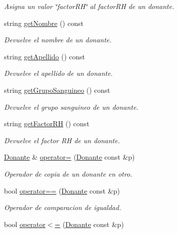 \begin{DoxyCompactItemize}
\begin{DoxyCompactList}\small\item\em Asigna un valor \char`\"{}factor\-R\-H\char`\"{} al factor\-R\-H de un donante. \end{DoxyCompactList}\item 
string \hyperlink{classed_1_1Donante_a6ee5ef3051ee5e87aecefbbb68907d4a}{get\-Nombre} () const 
\begin{DoxyCompactList}\small\item\em Devuelve el nombre de un donante. \end{DoxyCompactList}\item 
string \hyperlink{classed_1_1Donante_a3c47b3238b610ea3541161bc1a90d9f8}{get\-Apellido} () const 
\begin{DoxyCompactList}\small\item\em Devuelve el apellido de un donante. \end{DoxyCompactList}\item 
string \hyperlink{classed_1_1Donante_a6a6d49990afd2da9908df86462457049}{get\-Grupo\-Sanguineo} () const 
\begin{DoxyCompactList}\small\item\em Devuelve el grupo sanguineo de un donante. \end{DoxyCompactList}\item 
string \hyperlink{classed_1_1Donante_a61c107f22340497f4bf5169997be5ddc}{get\-Factor\-R\-H} () const 
\begin{DoxyCompactList}\small\item\em Devuelve el factor R\-H de un donante. \end{DoxyCompactList}\item 
\hyperlink{classed_1_1Donante}{Donante} \& \hyperlink{classed_1_1Donante_af8cc31baf86b839a5b08b15d52da31a4}{operator=} (\hyperlink{classed_1_1Donante}{Donante} const \&p)
\begin{DoxyCompactList}\small\item\em Operador de copia de un donante en otro. \end{DoxyCompactList}\item 
bool \hyperlink{classed_1_1Donante_ad573bdc55211e23bcb2c6906a5d64f6b}{operator==} (\hyperlink{classed_1_1Donante}{Donante} const \&p)
\begin{DoxyCompactList}\small\item\em Operador de comparacion de igualdad. \end{DoxyCompactList}\item 
bool \hyperlink{classed_1_1Donante_aedaee5673a9c9f5fef2e94d3d3383b27}{operator$<$=} (\hyperlink{classed_1_1Donante}{Donante} const \&p)

\end{DoxyCompactItemize}
